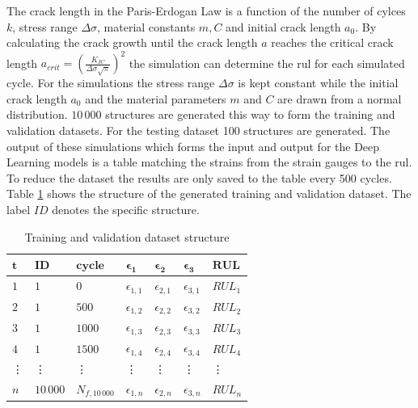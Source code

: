 \documentclass[conference]{IEEEtran}
\begin{document}
The crack length in the Paris-Erdogan Law is a function of the number of cylces $k$, stress range $\Delta \sigma$, material constants $m, C$ and initial crack length $a_0$. By calculating the crack growth until the crack length $a$ reaches the critical crack length $a_{crit}=(\frac{K_{IC}}{\Delta \sigma \sqrt{\pi}})^2$ the simulation can determine the \gls{rul} for each simulated cycle. For the simulations the stress range $\Delta \sigma$ is kept constant while the initial crack length $a_0$ and the material parameters $m$ and $C$ are drawn from a normal distribution. $ 10\,000 $ structures are generated this way to form the training and validation datasets. For the testing dataset 100 structures are generated. The output of these simulations which forms the input and output for the Deep Learning models is a table matching the strains from the strain gauges to the \gls{rul}. To reduce the dataset the results are only saved to the table every 500 cycles. Table \ref{tab:sliding_window_approach} shows the structure of the generated training and validation dataset. The label $ ID $ denotes the specific structure.

\begin{table}[htp]
	\centering
	\caption{Training and validation dataset structure}
	\label{tab:sliding_window_approach}
	\begin{tabular}{lllllll}
		$ \boldsymbol{t} $ & $ \boldsymbol{ID} $ & $ \boldsymbol{cycle} $ & $ \boldsymbol{\epsilon_1} $     & $ \boldsymbol{\epsilon_2} $     & $ \boldsymbol{\epsilon_3} $     & $ \boldsymbol{RUL} $   \\
		\hline
		$ 1 $ & $ 1 $  & $ 0 $     & $ \epsilon_{1,1} $ & $ \epsilon_{2,1} $ &  $ \epsilon_{3,1} $ &  $ RUL_1 $ \\
		$ 2 $ & $ 1 $  & $ 500 $   & $ \epsilon_{1,2} $ & $ \epsilon_{2,2} $ & $ \epsilon_{3,2} $ & $ RUL_2 $ \\
		$ 3 $ & $ 1 $  & $ 1000 $  & $ \epsilon_{1,3} $ & $ \epsilon_{2,3} $ & $ \epsilon_{3,3} $ & $ RUL_3 $ \\
		$ 4 $ & $ 1 $  & $ 1500 $  & $ \epsilon_{1,4} $ & $ \epsilon_{2,4} $ & $ \epsilon_{3,4} $ & $ RUL_4 $ \\
		\vdots & \vdots & \vdots & \vdots & \vdots &\vdots & \vdots \\
		$ n $ & $ 10\,000 $  & $ N_{f,10\,000} $  & $ \epsilon_{1,n} $ & $ \epsilon_{2,n} $ & $ \epsilon_{3,n} $ & $ RUL_n $
	\end{tabular}
\end{table}
\end{document}

